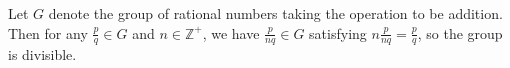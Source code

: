 \documentclass[12pt]{article}
\newcommand{\mb}{\mathbb}
\newcommand{\Z}{\mb{Z}}
\newcommand{\<}{\langle}
\renewcommand{\>}{\rangle}
\begin{document}
Let $G$ denote the group of rational numbers taking the operation to be addition.  Then for any $\frac{p}{q}\in G$ and $n\in\Z^+$, we have $\frac{p}{nq}\in G$ satisfying $n\frac{p}{nq}=\frac{p}{q}$, so the group is divisible.
\end{document}
